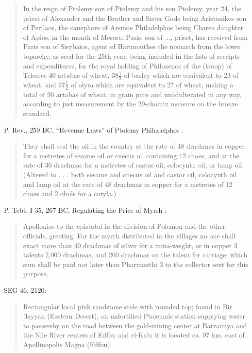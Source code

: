 \documentclass{article}
\begin{document}
\begin{quote}
In the reign of Ptolemy son of Ptolemy and his son Ptolemy, year 24, the
priest of Alexander and the Brother and Sister Gods being Aristonikos son of
Perilaos, the canephore of Arsinoe Philadelphos being Charea daughter of
Apios, in the month of Mesore. Pasis, son of ..., priest, has received from
Paris son of Sisybaios, agent of Harimouthes the nomarch from the lower
toparchy, as seed for the 25th year, being included in the lists of receipts
and expenditures, for the royal holding of Philoxenos of the (troop) of
Telestes 40 artabas of wheat, $38 \frac{1}{3}$
of barley which are equivalent to 23 of
wheat, and $67 \frac{1}{2}$ of olyra which are equivalent to 27 of wheat, making a total
of 90 artabas of wheat, in grain pure and unadulterated in any way, according
to just measurement by the 29-choinix measure on the bronze standard.
\end{quote}

P. Rev., 259 BC, ``Revenue Laws'' of Ptolemy Philadelphos \cite[p.~188]{hellenistic2004}:

\begin{quote}
They shall seal the oil in the country at the rate of 48 drachmas in copper
for a metretes of sesame oil or cnecus oil containing 12 choes, and at the rate
of 30 drachmas for a metretes of castor oil, colocynth oil, or lamp oil. (Altered
to . . . both sesame and cnecus oil and castor oil, colocynth oil and lamp oil at
the rate of 48 drachmas in copper for a metretes of 12 choes and 2 obols for
a cotyla.)
\end{quote}

P. Tebt. I 35, 267 BC, Regulating the Price of Myrrh \cite[p.~197]{hellenistic2004}:

\begin{quote}
Apollonios to the epistatai in the division of Polemon and the other officials,
greeting. For the myrrh distributed in the villages no one shall exact more
than 40 drachmas of silver for a mina-weight, or in copper 3 talents 2,000
drachmas, and 200 drachmas on the talent for carriage; which sum shall be
paid not later than Pharmouthi 3 to the collector sent for this purpose. 
\end{quote}





SEG 46, 2120:

\begin{quote}
Rectangular local pink sandstone stele with rounded top; found in Bir 'Iayyan (Eastern Desert), an unfortified Ptolemaic station supplying water to passersby on the road between the gold-mining center at Barramiya and the Nile River centers of Edfou and el-Kab; it is located ca. 97 km. east of Apollinopolis Magna (Edfou).
\end{quote}
\end{document}
